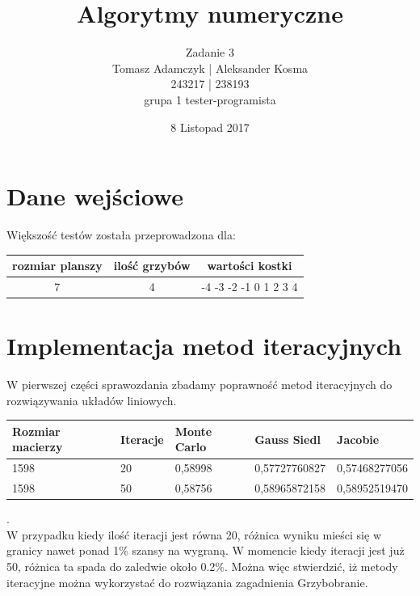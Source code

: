 \documentclass[8pt]{article}
\title{Algorytmy numeryczne}
\author{Zadanie 3 \\ Tomasz Adamczyk | Aleksander Kosma\\243217 | 238193\\grupa 1 tester-programista}
\date{8 Listopad 2017}
\begin{document}
\maketitle 

\section*{Dane wejściowe}
Większość testów została przeprowadzona dla:\\

\begin{center}
\begin{tabular}{  | c | c | c | }
  \hline
  rozmiar planszy & ilość grzybów & wartości kostki \\\hline
  7 &4& -4 -3 -2 -1 0 1 2 3 4\\\hline
  \hline
\end{tabular} 
\end{center}

\section*{Implementacja metod iteracyjnych}
W pierwszej części sprawozdania zbadamy poprawność metod iteracyjnych do rozwiązywania układów liniowych.\\
\begin{center}
\begin{tabular}{| p{3.2cm} | p{1.2cm}| p{2.2cm} | p{2.5cm} | p{2.5cm} | }
  \hline
  Rozmiar macierzy & Iteracje & Monte Carlo & Gauss Siedl & Jacobie \\\hline
  1598 &20&0,58998& 0,57727760827 & 0,57468277056 \\\hline
  1598 &50&0,58756& 0,58965872158 & 0,58952519470 \\\hline
  
  \hline
\end{tabular}
\end{center}
 .\\W przypadku kiedy ilość iteracji jest równa 20, różnica wyniku mieści się w granicy nawet ponad 1\% szansy na wygraną. W momencie kiedy iteracji jest już 50, różnica ta spada do zaledwie około 0.2\%.  Można więc stwierdzić, iż metody iteracyjne można wykorzystać do rozwiązania zagadnienia Grzybobranie.
\end{document}

